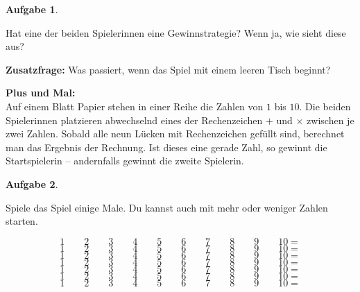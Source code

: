 \documentclass[a4paper,ngerman,12pt]{scrartcl}
\theoremstyle{definition}
\newtheorem{aufg}{Aufgabe}
\newenvironment{aufgabe}[1][]
		{\begin{shaded}\vspace{-0.3cm}\begin{aufg}\emph{#1} \par\medskip}
		{\end{aufg}\vspace{-0.3cm}\end{shaded}}
\newenvironment{spiel}[1][]{\begin{framed}\textbf{#1:}\\}{\end{framed}}
\theoremstyle{plain}
\theoremstyle{remark}
\begin{document}
\begin{aufgabe}
	Hat eine der beiden Spielerinnen eine Gewinnstrategie? Wenn ja, wie sieht diese aus?
	
	\textbf{Zusatzfrage:} Was passiert, wenn das Spiel mit einem leeren Tisch beginnt?
\end{aufgabe}


\newpage
\begin{spiel}[Plus und Mal]
	Auf einem Blatt Papier stehen in einer Reihe die Zahlen von $1$ bis $10$. Die beiden Spielerinnen platzieren abwechselnd eines der Rechenzeichen $+$ und $\times$ zwischen je zwei Zahlen. Sobald alle neun Lücken mit Rechenzeichen gefüllt sind, berechnet man das Ergebnis der Rechnung. Ist dieses eine gerade Zahl, so gewinnt die Startspielerin -- andernfalls gewinnt die zweite Spielerin.
\end{spiel}

\begin{aufgabe}
	Spiele das Spiel einige Male. Du kannst auch mit mehr oder weniger Zahlen starten.
\end{aufgabe}

\begin{center}\Large
	\[1 \qquad 2 \qquad 3 \qquad 4 \qquad 5 \qquad 6 \qquad 7 \qquad 8 \qquad 9 \qquad 10 = \]\vspace{.5em}
	\[1 \qquad 2 \qquad 3 \qquad 4 \qquad 5 \qquad 6 \qquad 7 \qquad 8 \qquad 9 \qquad 10 = \]\vspace{.5em}
	\[1 \qquad 2 \qquad 3 \qquad 4 \qquad 5 \qquad 6 \qquad 7 \qquad 8 \qquad 9 \qquad 10 = \]\vspace{.5em}
	\[1 \qquad 2 \qquad 3 \qquad 4 \qquad 5 \qquad 6 \qquad 7 \qquad 8 \qquad 9 \qquad 10 = \]\vspace{.5em}
	\[1 \qquad 2 \qquad 3 \qquad 4 \qquad 5 \qquad 6 \qquad 7 \qquad 8 \qquad 9 \qquad 10 = \]\vspace{.5em}
	\[1 \qquad 2 \qquad 3 \qquad 4 \qquad 5 \qquad 6 \qquad 7 \qquad 8 \qquad 9 \qquad 10 = \]\vspace{.5em}
	\[1 \qquad 2 \qquad 3 \qquad 4 \qquad 5 \qquad 6 \qquad 7 \qquad 8 \qquad 9 \qquad 10 = \]\vspace{.5em}
\end{center}
\end{document}
